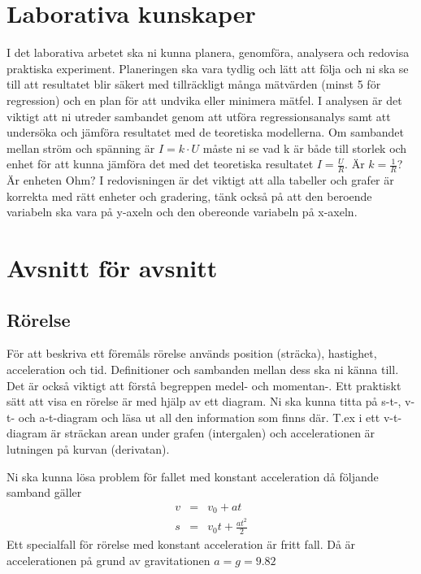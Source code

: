 \documentclass[10pt, titlepage, oneside, a4paper]{article}
\newcommand{\Section}[1]{\section{#1}\vspace{-8pt}}
\newcommand{\Subsection}[1]{\vspace{-4pt}\subsection{#1}\vspace{-8pt}}
\begin{document}
    \Section{Laborativa kunskaper}
    I det laborativa arbetet ska ni kunna planera, genomföra, analysera och redovisa praktiska experiment.
    Planeringen ska vara tydlig och lätt att följa och ni ska se till att resultatet blir säkert med
    tillräckligt många mätvärden (minst 5 för regression) och en plan för att undvika eller minimera
    mätfel. I analysen är det viktigt att ni utreder sambandet genom att utföra regressionsanalys samt
    att undersöka och jämföra resultatet med de teoretiska modellerna. Om sambandet mellan ström och
    spänning är $I = k \cdot U$ måste ni se vad k är både till storlek och enhet för att kunna jämföra
    det med det teoretiska resultatet $ I = \frac{U}{R}$. Är $k = \frac{1}{R}$? Är enheten Ohm? I
    redovisningen är det viktigt att alla tabeller och grafer är korrekta med rätt enheter och gradering,
    tänk också på att den beroende variabeln ska vara på y-axeln och den obereonde variabeln på x-axeln.
    \newpage
    \Section{Avsnitt för avsnitt}
    \Subsection{Rörelse}
    För att beskriva ett föremåls rörelse används position (sträcka), hastighet, acceleration och tid.
    Definitioner och sambanden mellan dess ska ni känna till. Det är också viktigt att förstå begreppen medel- och momentan-.
    Ett praktiskt sätt att visa en rörelse är med hjälp av ett diagram. Ni ska kunna titta på s-t-, v-t- och a-t-diagram
    och läsa ut all den information som finns där. T.ex i ett v-t-diagram är sträckan arean under grafen (intergalen) och
    accelerationen är lutningen på kurvan (derivatan).

    Ni ska kunna lösa problem för fallet med konstant acceleration då följande samband gäller
    \begin{eqnarray}
        v&=&v_0 + at \\
        s&=&v_0t + \frac{at^2}{2}
    \end{eqnarray}
    Ett specialfall för rörelse med konstant acceleration är fritt fall. Då är accelerationen på grund av
    gravitationen $a=g=9.82$
\end{document}
